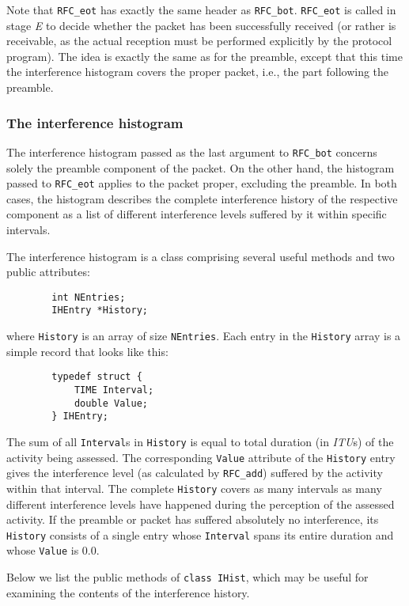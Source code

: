 Note that {\tt RFC\_eot} has exactly
the same header as {\tt RFC\_bot}.
{\tt RFC\_eot} is called in stage {\em E\/} to decide whether the packet
has been successfully received (or rather is receivable, as the actual
reception must be performed explicitly by the protocol program).
The idea is exactly the same as for the preamble, except that this time
the interference histogram covers the proper packet, i.e., the part following
the preamble.

\subsubsection{The interference histogram}
\label{rm_tr_ra_ih}

The interference histogram passed as the last argument to
{\tt RFC\_bot} concerns solely the preamble component of the packet.
On the other hand, the histogram passed to
{\tt RFC\_eot}
applies to the packet proper, excluding the preamble.
In both cases, the histogram describes the complete interference
history of the respective component as a list of different interference
levels suffered by it within specific intervals.

The interference histogram is 
a class comprising several useful methods and two public attributes:
\begin{verbatim}
        int NEntries;
        IHEntry *History;
\end{verbatim}
\noindent
where {\tt History} is an array of size {\tt NEntries}.
Each entry in the {\tt History} array is a simple record that looks
like this:
\begin{verbatim}
        typedef struct {
            TIME Interval;
            double Value;
        } IHEntry;
\end{verbatim}

The sum of all {\tt Interval}s in {\tt History} is equal to total duration
(in {\em ITU\/}s) of the activity being assessed.
The corresponding {\tt Value} attribute of the {\tt History} entry gives the
interference level (as calculated by
{\tt RFC\_add}) suffered by the activity within that interval.
The complete {\tt History} covers as many intervals as many different
interference levels have happened during the perception of the
assessed activity.
If the preamble or packet
has suffered absolutely no interference, its
{\tt History} consists of a single entry whose {\tt Interval} spans its
entire duration and whose {\tt Value} is 0.0.

Below we list the public methods of {\tt class IHist}, which may be useful
for examining the contents of the interference history.

